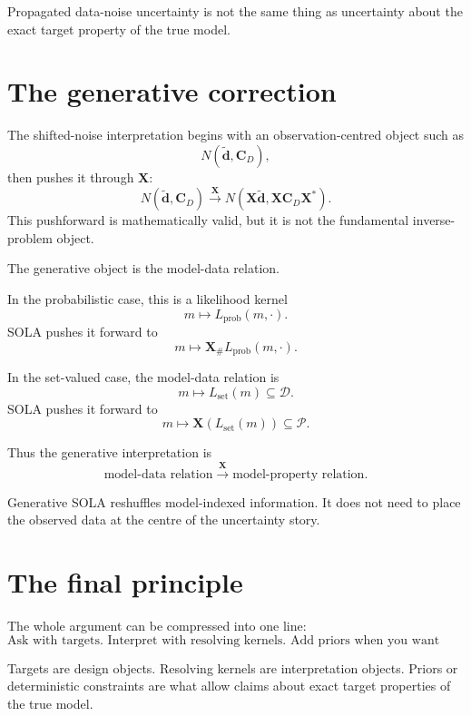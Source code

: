 \documentclass[11pt,openany]{book}
\theoremstyle{definition}
\theoremstyle{remark}
\newcommand{\D}{\mathcal D}
\newcommand{\Pspace}{\mathcal P}
\begin{document}
\begin{lessonbox}
Propagated data-noise uncertainty is not the same thing as uncertainty about the exact target
property of the true model.
\end{lessonbox}

\section{The generative correction}

The shifted-noise interpretation begins with an observation-centred object such as
\[
  N(\widetilde{\mathbf d},\mathbf C_D),
\]
then pushes it through \(\mathbf X\):
\[
  N(\widetilde{\mathbf d},\mathbf C_D)
  \xrightarrow{\;\mathbf X\;}
  N(\mathbf X\widetilde{\mathbf d},\mathbf X\mathbf C_D\mathbf X^*).
\]
This pushforward is mathematically valid, but it is not the fundamental inverse-problem object.

The generative object is the model-data relation.

In the probabilistic case, this is a likelihood kernel
\[
  m\mapsto L_{\mathrm{prob}}(m,\cdot).
\]
SOLA pushes it forward to
\[
  m
  \mapsto
  \mathbf X_{\#}L_{\mathrm{prob}}(m,\cdot).
\]

In the set-valued case, the model-data relation is
\[
  m\mapsto L_{\mathrm{set}}(m)\subseteq\D.
\]
SOLA pushes it forward to
\[
  m
  \mapsto
  \mathbf X(L_{\mathrm{set}}(m))\subseteq\Pspace.
\]

Thus the generative interpretation is
\[
  \text{model-data relation}
  \xrightarrow{\;\mathbf X\;}
  \text{model-property relation}.
\]

\begin{lessonbox}
Generative SOLA reshuffles model-indexed information. It does not need to place the observed
data at the centre of the uncertainty story.
\end{lessonbox}

\section{The final principle}

The whole argument can be compressed into one line:
\[
  \boxed{
    \text{Ask with targets. Interpret with resolving kernels. Add priors when you want truth.}
  }
\]

Targets are design objects. Resolving kernels are interpretation objects. Priors or deterministic
constraints are what allow claims about exact target properties of the true model.
\end{document}
